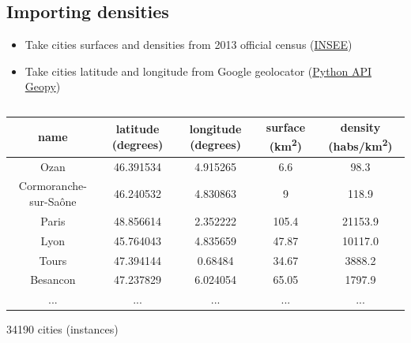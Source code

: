 \documentclass[c]{beamer}
\begin{document}
\subsection{Importing densities}
\begin{frame}
 \begin{itemize}
  \item Take cities surfaces and densities from 2013 official census (\href{http://www.insee.fr/fr/ppp/bases-de-donnees/recensement/populations-legales/pages2015/zip/HIST_POP_COM_RP13.zip}{INSEE})
  \item Take cities latitude and longitude from Google geolocator (\href{https://geopy.readthedocs.io/en/1.10.0/}{Python API Geopy})
 \end{itemize}

\begin{columns}
\begin{column}{0.80\textwidth}
\begin{overlayarea}{\linewidth}{3cm}
\begin{table}
\begin{center}
\begin{adjustbox}{max width=\textwidth}
{\LARGE
\begin{tabular}{|c|c|c|c|c|}
\hline 
name & latitude (degrees) & longitude (degrees) & surface (km\textsuperscript{2}) & density (habs/km\textsuperscript{2}) \\
\hline
Ozan & 46.391534 & 4.915265 & 6.6 & 98.3\\
\hline 
Cormoranche-sur-Sa\^{o}ne & 46.240532 & 4.830863 & 9 & 118.9\\
\hline 
Paris & 48.856614 & 2.352222 & 105.4 & 21153.9\\
\hline
Lyon & 45.764043 & 4.835659 & 47.87 & 10117.0\\
\hline
Tours & 47.394144 & 0.68484 & 34.67 & 3888.2\\
\hline
Besancon & 47.237829 & 6.024054 & 65.05 & 1797.9\\
\hline 
... & ... & ... & ... & ... \\
\hline
\end{tabular}
}
\end{adjustbox}
\end{center}
\end{table}
\end{overlayarea}
\begin{overlayarea}{\linewidth}{1cm}
  \centering
  \scriptsize34190 cities (instances)\par
\end{overlayarea}
\end{column}
\end{columns}

\end{frame}
\end{document}
